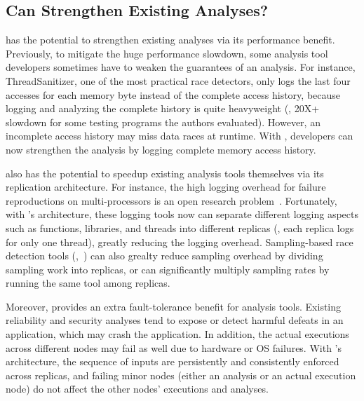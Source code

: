 \subsection{Can \xxx Strengthen Existing Analyses?} 
\label{sec:strengthen-analysis}

\xxx has the potential to strengthen existing analyses via its performance 
benefit. Previously, to mitigate the huge performance slowdown, some analysis 
tool developers sometimes have to weaken the guarantees of an analysis. For 
instance, ThreadSanitizer\cite{tsan}, one of the most practical race detectors, 
only logs the last four accesses for each memory byte instead of the complete 
access history, because logging and analyzing the complete history is quite 
heavyweight (\eg, 20X+ slowdown for some testing programs the authors 
evaluated). However, an incomplete access history may miss data races at 
runtime. With \xxx, developers can now strengthen the analysis by logging 
complete memory access history.

\xxx also has the potential to speedup existing analysis tools themselves via 
its replication architecture. For instance, the high logging overhead for 
failure reproductions on multi-processors is an open research 
problem~\cite{sherlog:asplos10}. Fortunately, with \xxx's architecture, these 
logging tools now can separate different logging aspects such as functions, 
libraries, and threads into different replicas (\eg, each replica logs for only 
one thread), greatly reducing the logging overhead. Sampling-based race 
detection tools (\eg,~\cite{datacollider:osdi10}) can also grealty reduce 
sampling overhead by dividing sampling work into replicas, or can significantly 
multiply sampling rates by running the same tool among replicas.

Moreover, \xxx provides an extra fault-tolerance benefit for analysis tools. 
Existing reliability and security analyses tend to expose or detect harmful 
defeats in an application, which may crash the application. In addition, the 
actual executions across different nodes may fail as well due to hardware or OS 
failures. With \xxx's \smr architecture, the sequence of inputs are 
persistently and consistently enforced across replicas, and failing minor 
nodes (either an analysis or an actual execution node) do not affect the other 
nodes' executions and analyses.

% 

